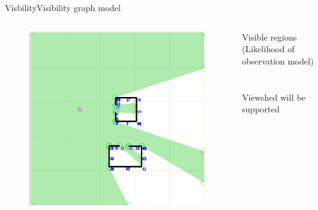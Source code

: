 \begin{frame}{Visbility}{Visibility graph model}

\begin{columns}
\begin{figure}
\centering
\includegraphics[width = \textwidth]{./screenshot/visibility_graph.png}
\end{figure}

\begin{minipage}{\textwidth}
Visible regions \\
(Likelihood of observation model) \\
\\
\\
Viewshed will be supported
\end{minipage}
\end{columns}

\end{frame}